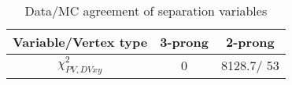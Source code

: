 \documentclass{article}
\begin{document}
\begin{table}[htbp]
\caption{\label{tab:sepVars}Data/MC agreement of separation variables}
\begin{center}
\begin{tabular}{c|c|c}
Variable/Vertex type & 3-prong & 2-prong\\
\hline
$\chi^{2}_{PV,DV xy}$ & 0 & 8128.7/ 53\\
\hline
\end{tabular}
\end{center}
\end{table}
\end{document}
